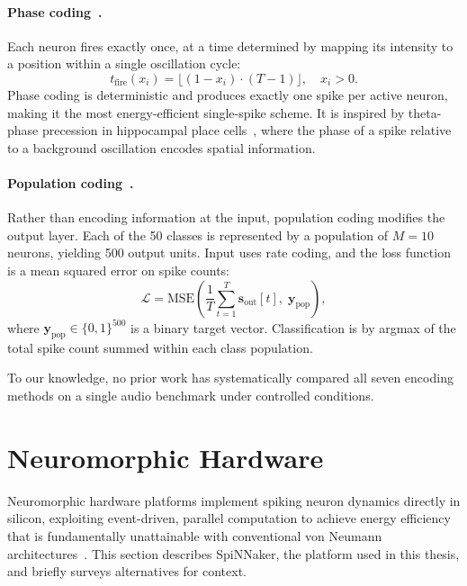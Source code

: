 \paragraph{Phase coding~\citep{okeefe1993}.}
Each neuron fires exactly once, at a time determined by mapping its intensity to a position within a single oscillation cycle:
\begin{equation}
    t_{\mathrm{fire}}(x_i) = \bigl\lfloor (1 - x_i) \cdot (T - 1) \bigr\rfloor, \quad x_i > 0.
    \label{eq:phase-coding}
\end{equation}
Phase coding is deterministic and produces exactly one spike per active neuron, making it the most energy-efficient single-spike scheme. It is inspired by theta-phase precession in hippocampal place cells~\citep{okeefe1993,montemurro2008}, where the phase of a spike relative to a background oscillation encodes spatial information.

\paragraph{Population coding~\citep{georgopoulos1986}.}
Rather than encoding information at the input, population coding modifies the output layer. Each of the 50 classes is represented by a population of $M = 10$ neurons, yielding 500 output units. Input uses rate coding, and the loss function is a mean squared error on spike counts:
\begin{equation}
    \mathcal{L} = \mathrm{MSE}\!\left(\frac{1}{T}\sum_{t=1}^{T} \mathbf{s}_{\mathrm{out}}[t], \;\mathbf{y}_{\mathrm{pop}}\right),
    \label{eq:population-coding}
\end{equation}
where $\mathbf{y}_{\mathrm{pop}} \in \{0,1\}^{500}$ is a binary target vector. Classification is by argmax of the total spike count summed within each class population.

To our knowledge, no prior work has systematically compared all seven encoding methods on a single audio benchmark under controlled conditions.


\section{Neuromorphic Hardware}
\label{sec:neuromorphic-hardware}

Neuromorphic hardware platforms implement spiking neuron dynamics directly in silicon, exploiting event-driven, parallel computation to achieve energy efficiency that is fundamentally unattainable with conventional von Neumann architectures~\citep{schuman2022}. This section describes SpiNNaker, the platform used in this thesis, and briefly surveys alternatives for context.

